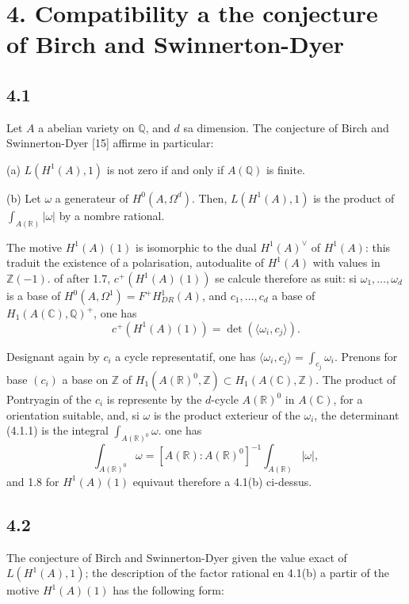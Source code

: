 \documentclass[12pt,a4paper]{article}
\theoremstyle{plain}
\theoremstyle{definition}
\theoremstyle{remark}
\newcommand{\Q}{\mathbb{Q}}
\newcommand{\R}{\mathbb{R}}
\newcommand{\C}{\mathbb{C}}
\newcommand{\Z}{\mathbb{Z}}
\begin{document}
\section*{4. Compatibility a the conjecture of Birch and Swinnerton-Dyer}

\subsection*{4.1}

Let $A$ a abelian variety on $\Q$, and $d$ sa dimension. The conjecture of
Birch and Swinnerton-Dyer [15] affirme in particular:

(a) $L(H^1(A), 1)$ is not zero if and only if $A(\Q)$ is finite.

(b) Let $\omega$ a generateur of $H^0(A, \Omega^d)$. Then, $L(H^1(A), 1)$ is the product of
$\int_{A(\R)} |\omega|$ by a nombre rational.

The motive $H^1(A)(1)$ is isomorphic to the dual $H^1(A)^\vee$ of $H^1(A)$: this traduit the existence
of a polarisation, autodualite of $H^1(A)$ with values in $\Z(-1)$. of after 1.7,
$c^+(H^1(A)(1))$ se calcule therefore as suit: si $\omega_1, \ldots, \omega_d$ is a base of
$H^0(A, \Omega^1) = F^+ H^1_{DR}(A)$, and $c_1, \ldots, c_d$ a base of $H_1(A(\C), \Q)^+$, one has
\begin{equation}\label{eq:4.1.1}
c^+(H^1(A)(1)) = \det(\langle \omega_i, c_j \rangle).
\end{equation}

Designant again by $c_i$ a cycle representatif, one has $\langle \omega_i, c_j \rangle = \int_{c_j} \omega_i$.
Prenons for base $(c_i)$ a base on $\Z$ of $H_1(A(\R)^0, \Z) \subset H_1(A(\C), \Z)$. The
product of Pontryagin of the $c_i$ is represente by the $d$-cycle $A(\R)^0$ in $A(\C)$, for a
orientation suitable, and, si $\omega$ is the product exterieur of the $\omega_i$, the determinant
(4.1.1) is the integral $\int_{A(\R)^0} \omega$. one has
\[
\int_{A(\R)^0} \omega = [A(\R): A(\R)^0]^{-1} \int_{A(\R)} |\omega|,
\]
and 1.8 for $H^1(A)(1)$ equivaut therefore a 4.1(b) ci-dessus.

\subsection*{4.2}

The conjecture of Birch and Swinnerton-Dyer given the value exact of
$L(H^1(A), 1)$; the description of the factor rational en 4.1(b) a partir of the motive $H^1(A)(1)$
has the following form:
\end{document}
